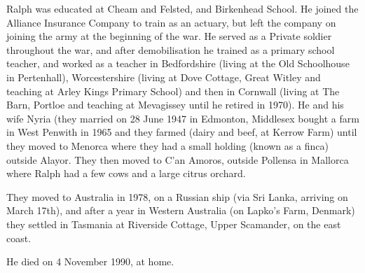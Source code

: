 Ralph was educated at Cheam and Felsted, and Birkenhead School. He joined the Alliance Insurance Company to train as an actuary, but left the company on joining the army at the beginning of the war. He served as a Private soldier throughout the war, and after demobilisation he trained as a primary school teacher, and worked as a teacher in Bedfordshire (living at the Old Schoolhouse in Pertenhall), Worcestershire (living at Dove Cottage, Great Witley and teaching at Arley Kings Primary School) and then in Cornwall (living at The Barn, Portloe and teaching at Mevagissey until he retired in 1970). He and his wife Nyria (they married on 28 June 1947 in Edmonton, Middlesex \cite{MarriageCertRalphDentonBarkerJoanNyriaPowell} bought a farm in West Penwith in 1965 and they farmed (dairy and beef, at Kerrow Farm) until they moved to Menorca where they had a small holding (known as a finca) outside Alayor. They then moved to C'an Amoros, outside Pollensa in Mallorca where Ralph had a few cows and a large citrus orchard.

They moved to Australia in 1978, on a Russian ship (via Sri Lanka, arriving on March 17th), and after a year in Western Australia (on Lapko's Farm, Denmark) they settled in Tasmania at Riverside Cottage, Upper Scamander, on the east coast.

He died on 4 November 1990, at home.
